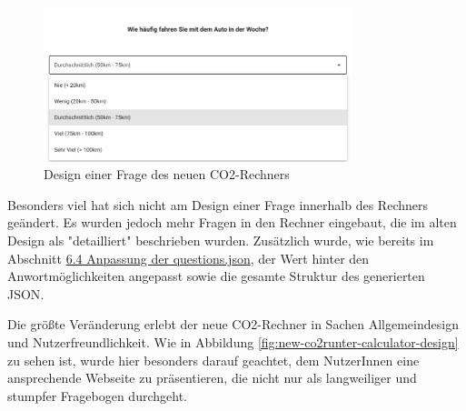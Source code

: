 \begin{figure}[H]
    \centering
    \includegraphics[width=0.8\textwidth]{images/06/Question_New_Design.png}
    \caption{Design einer Frage des neuen CO2-Rechners}
    \label{fig:new-co2runter-question-design}
\end{figure}

Besonders viel hat sich nicht am Design einer Frage innerhalb des Rechners geändert.
Es wurden jedoch mehr Fragen in den Rechner eingebaut, die im alten Design als "detailliert" beschrieben wurden. Zusätzlich wurde, wie bereits im Abschnitt \hyperref[sec:anpassung-der-questions-json]{6.4 Anpassung der questions.json}, der Wert hinter den Anwortmöglichkeiten angepasst sowie die gesamte Struktur des generierten \acs{JSON}.

Die größte Veränderung erlebt der neue CO2-Rechner in Sachen Allgemeindesign und Nutzerfreundlichkeit. Wie in Abbildung \ref{fig:new-co2runter-calculator-design} zu sehen ist, wurde hier besonders darauf geachtet, dem NutzerInnen eine ansprechende Webseite zu präsentieren, die nicht nur als langweiliger und stumpfer Fragebogen durchgeht.

